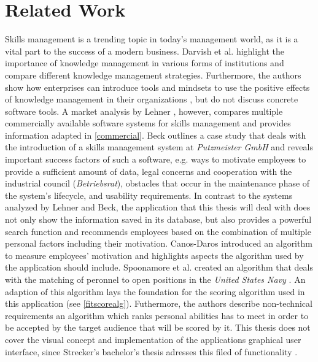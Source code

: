 \chapter{Related Work}

Skills management is a trending topic in today's management world, as it is a vital part to the success of a modern business.
Darvish et al. highlight the importance of knowledge management in various forms of institutions and compare different knowledge management strategies.
Furthermore, the authors show how enterprises can introduce tools and mindsets to use the positive effects of knowledge management in their organizations \cite{darvish}, but do not discuss concrete software tools.
A market analysis by Lehner \cite{Marktanalyse}, however, compares multiple commercially available software systems for skills management and provides information adapted in \ref{commercial}.
\newline
Beck outlines a case study that deals with the introduction of a skills management system at \textit{Putzmeister GmbH} \cite{beck} and reveals important success factors of such a software, e.g. ways to motivate employees to provide a sufficient amount of data, legal concerns and cooperation with the industrial council (\textit{Betriebsrat}), obstacles that occur in the maintenance phase of the system's lifecycle, and usability requirements.
\newline
In contrast to the systems analyzed by Lehner and Beck, the application that this thesis will deal with does not only
show the information saved in its database, but also provides a powerful search function and recommends employees based on the combination of multiple personal factors including their motivation. Canos-Daros introduced an algorithm
to measure employees' motivation \cite{CanosDaros2013} and highlights aspects the algorithm used by the application should include.
\newline
Spoonamore et al. created an algorithm that deals with the matching of peronnel to open positions in the \textit{United States Navy} \cite{USN}. An adaption of this algorithm lays the foundation for the scoring algorithm used in this application (see \ref{fitscorealg}). Futhermore, the authors describe non-technical requirements an algorithm which ranks personal abilities has to
meet in order to be accepted by the target audience that will be scored by it.
\newline
This thesis does not cover the visual concept and implementation of the applications graphical user interface, since
Strecker's bachelor's thesis adresses this filed of functionality \cite{strecker}.
